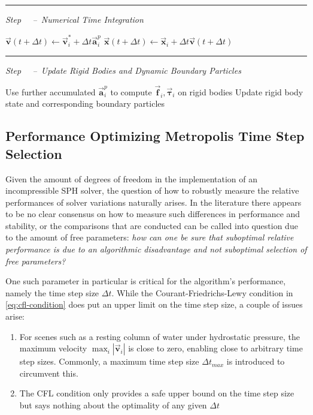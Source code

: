 \documentclass[oneside, a4paper]{book}
\newcounter{phase}[algorithm]
\newlength{\phaserulewidth}
\newcommand{\Phase}[1]{%
  \vspace{-1.25ex}
  \Statex\leavevmode\llap{\rule{\dimexpr\labelwidth+\labelsep}{\phaserulewidth}}\rule{\linewidth}{\phaserulewidth}
  \Statex\strut\refstepcounter{phase}\textit{Step ~\thephase~--~#1}%
  }
\newcommand\abs[1]{\left|#1\right|}
\newcommand\vek[1]{\vec{\bm{#1}}}
\newcommand\br[1]{\left(#1\right)}
\begin{document}
\begin{algorithm}[H]
\begin{algorithmic}[1]
      \Phase{Numerical Time Integration}
      \State $\vek{v}\br{t+\Delta t} \gets \vek{v}_i^* +\Delta t \vek{a}_i^p$ 
      \State $\vek{x}\br{t+\Delta t} \gets \vek{x}_i +\Delta t \vek{v}\br{t+\Delta t}$ 

      \Phase{Update Rigid Bodies and Dynamic Boundary Particles}
      \State Use further accumulated $\vek{a}_i^{p}$ to compute $\vek{f}_i, \vek{\tau}_i$ on rigid bodies
      \State Update rigid body state and corresponding boundary particles 

    \end{algorithmic}
  \end{algorithm}



    \subsection{Performance Optimizing Metropolis Time Step Selection}\label{sec:optimal-time-step-controller}
    Given the amount of degrees of freedom in the implementation of an incompressible SPH solver, the question of how to robustly measure the relative performances of solver variations naturally arises. In the literature there appears to be no clear consensus on how to measure such differences in performance and stability, or the comparisons that are conducted can be called into question due to the amount of free parameters: \textit{how can one be sure that suboptimal relative performance is due to an algorithmic disadvantage and not suboptimal selection of free parameters?}

    One such parameter in particular is critical for the algorithm's performance, namely the time step size $\Delta t$. While the Courant-Friedrichs-Lewy condition in \autoref{eq:cfl-condition} does put an upper limit on the time step size, a couple of issues arise:
    \begin{enumerate}
      \item For scenes such as a resting column of water under hydrostatic pressure, the maximum velocity $\max_i\abs{\vek{v}_i}$ is close to zero, enabling close to arbitrary time step sizes. Commonly, a maximum time step size $\Delta t_{max}$ is introduced to circumvent this.
      \item The CFL condition only provides a safe upper bound on the time step size but says nothing about the optimality of any given $\Delta t$
    \end{enumerate}
\end{document}
